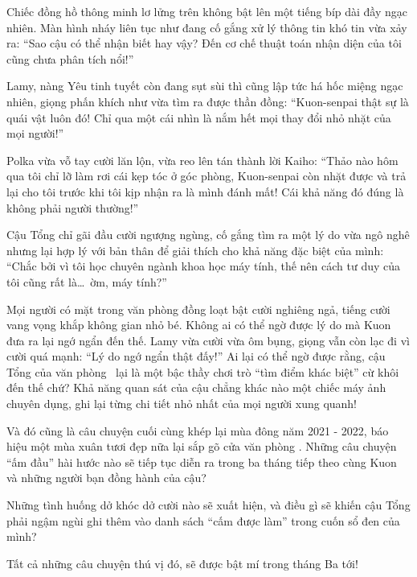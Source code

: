 \documentclass[../main.tex]{subfiles}
\begin{document}
Chiếc đồng hồ thông minh lơ lửng trên không bật lên một tiếng bíp dài đầy ngạc nhiên. Màn hình nháy liên tục như đang cố gắng xử lý thông tin khó tin vừa xảy ra: ``Sao cậu có thể nhận biết hay vậy? Đến cơ chế thuật toán nhận diện của tôi cũng chưa phân tích nổi!''

Lamy, nàng Yêu tinh tuyết còn đang sụt sùi thì cũng lập tức há hốc miệng ngạc nhiên, giọng phấn khích như vừa tìm ra được thần đồng: ``Kuon-senpai thật sự là quái vật luôn đó! Chỉ qua một cái nhìn là nắm hết mọi thay đổi nhỏ nhặt của mọi người!''

Polka vừa vỗ tay cười lăn lộn, vừa reo lên tán thành lời Kaiho: ``Thảo nào hôm qua tôi chỉ lỡ làm rơi cái kẹp tóc ở góc phòng, Kuon-senpai còn nhặt được và trả lại cho tôi trước khi tôi kịp nhận ra là mình đánh mất! Cái khả năng đó đúng là không phải người thường!''

Cậu Tổng chỉ gãi đầu cười ngượng ngùng, cố gắng tìm ra một lý do vừa ngô nghê nhưng lại hợp lý với bản thân để giải thích cho khả năng đặc biệt của mình: ``Chắc bởi vì tôi học chuyên ngành khoa học máy tính, thế nên cách tư duy của tôi cũng rất là\dots\ ờm, máy tính?''

Mọi người có mặt trong văn phòng đồng loạt bật cười nghiêng ngả, tiếng cười vang vọng khắp không gian nhỏ bé. Không ai có thể ngờ được lý do mà Kuon đưa ra lại ngớ ngẩn đến thế. Lamy vừa cười vừa ôm bụng, giọng vẫn còn lạc đi vì cười quá mạnh: ``Lý do ngớ ngẩn thật đấy!''
Ai lại có thể ngờ được rằng, cậu Tổng của văn phòng \hll\ lại là một bậc thầy chơi trò ``tìm điểm khác biệt'' cừ khôi đến thế chứ? Khả năng quan sát của cậu chẳng khác nào một chiếc máy ảnh chuyên dụng, ghi lại từng chi tiết nhỏ nhất của mọi người xung quanh!

\il

Và đó cũng là câu chuyện cuối cùng khép lại mùa đông năm 2021 - 2022, báo hiệu một mùa xuân tươi đẹp nữa lại sắp gõ cửa văn phòng \hll. Những câu chuyện ``ấm đầu'' hài hước nào sẽ tiếp tục diễn ra trong ba tháng tiếp theo cùng Kuon và những người bạn đồng hành của cậu?

Những tình huống dở khóc dở cười nào sẽ xuất hiện, và điều gì sẽ khiến cậu Tổng phải ngậm ngùi ghi thêm vào danh sách ``cấm được làm'' trong cuốn sổ đen của mình?

Tất cả những câu chuyện thú vị đó, sẽ được bật mí trong tháng Ba tới!
\end{document}
